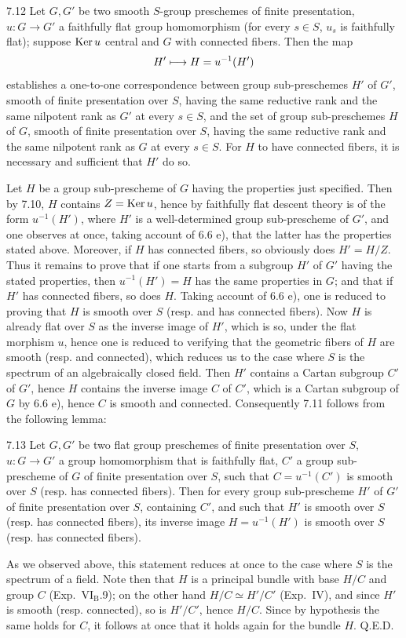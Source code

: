 \begin{corollary}{7.12}\label{XII.7.12}
Let $G,G'$ be two smooth $S$-group preschemes of finite presentation, $u:G\to G'$ a faithfully flat group homomorphism (\ie for every $s\in S$, $u_s$ is faithfully flat); suppose $\operatorname{Ker} u$ central and $G$ with connected fibers. Then the map
\[
H'\longmapsto H=u^{-1}(H')
\]
establishes a one-to-one correspondence between group sub-preschemes $H'$ of $G'$, smooth of finite presentation over $S$, having the same reductive rank and the same nilpotent rank as $G'$ at every $s\in S$, and the set of group sub-preschemes $H$ of $G$, smooth of finite presentation over $S$, having the same reductive rank and the same nilpotent rank as $G$ at every $s\in S$. For $H$ to have connected fibers, it is necessary and sufficient that $H'$ do so.
\end{corollary}
Let $H$ be a group sub-prescheme of $G$ having the properties just specified. Then by 7.10, $H$ contains $Z=\operatorname{Ker} u$, hence by faithfully flat descent theory is of the form $u^{-1}(H')$, where $H'$ is a well-determined group sub-prescheme of $G'$, and one observes at once, taking account of 6.6 e), that the latter has the properties stated above. Moreover, if $H$ has connected fibers, so obviously does $H'=H/Z$. Thus it remains to prove that if one starts from a subgroup $H'$ of $G'$ having the stated properties, then $u^{-1}(H')=H$ has the same properties in $G$; and that if $H'$ has connected fibers, so does $H$. Taking account of 6.6 e), one is reduced to proving that $H$ is smooth over $S$ (resp. and has connected fibers). Now $H$ is already flat over $S$ as the inverse image of $H'$, which is so, under the flat morphism $u$, hence one is reduced to verifying that the geometric fibers of $H$ are smooth (resp. and connected), which reduces us to the case where $S$ is the spectrum of an algebraically closed field. Then $H'$ contains a Cartan subgroup $C'$ of $G'$, hence $H$ contains the inverse image $C$ of $C'$, which is a Cartan subgroup of $G$ by 6.6 e), hence $C$ is smooth and connected. Consequently 7.11 follows from the following lemma:
\begin{lemma}{7.13}\label{XII.7.13}
Let $G,G'$ be two flat group preschemes of finite presentation over $S$, $u:G\to G'$ a group homomorphism that is faithfully flat, $C'$ a group sub-prescheme of $G$ of finite presentation over $S$, such that $C=u^{-1}(C')$ is smooth over $S$ (resp. has connected fibers). Then for every group sub-prescheme $H'$ of $G'$ of finite presentation over $S$, containing $C'$, and such that $H'$ is smooth over $S$ (resp. has connected fibers), its inverse image $H=u^{-1}(H')$ is smooth over $S$ (resp. has connected fibers).
\end{lemma}
As we observed above, this statement reduces at once to the case where $S$ is the spectrum of a field. Note then that $H$ is a principal bundle with base $H/C$ and group $C$ (Exp.~VI$_{\mathrm B}$.9); on the other hand $H/C\simeq H'/C'$ (\cf Exp.~IV), and since $H'$ is smooth (resp. connected), so is $H'/C'$, hence $H/C$. Since by hypothesis the same holds for $C$, it follows at once that it holds again for the bundle $H$. \hfill Q.E.D.

